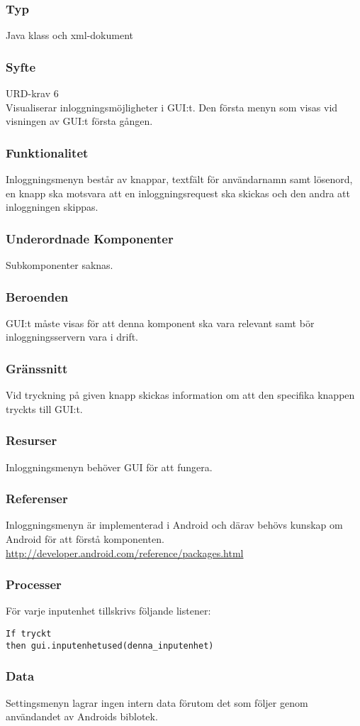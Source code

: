 \subsubsection{Typ}
Java klass och xml-dokument

\subsubsection{Syfte}
URD-krav 6 \\
Visualiserar inloggningsmöjligheter i GUI:t. Den första menyn som visas vid visningen av GUI:t första gången. 

\subsubsection{Funktionalitet}
Inloggningsmenyn består av knappar, textfält för användarnamn samt lösenord, en knapp ska motsvara att en inloggningsrequest ska skickas och den andra att inloggningen skippas.

\subsubsection{Underordnade Komponenter}
Subkomponenter saknas.

\subsubsection{Beroenden}
GUI:t måste visas för att denna komponent ska vara relevant samt bör inloggningsservern vara i drift.

\subsubsection{Gränssnitt}
Vid tryckning på given knapp skickas information om att den specifika knappen tryckts till GUI:t.

\subsubsection{Resurser}
Inloggningsmenyn behöver GUI för att fungera.

\subsubsection{Referenser}
Inloggningsmenyn är implementerad i Android och därav behövs kunskap om Android för att förstå komponenten.
\url{http://developer.android.com/reference/packages.html}

\subsubsection{Processer}
För varje inputenhet tillskrivs följande listener:
\begin{verbatim}
If tryckt
then gui.inputenhetused(denna_inputenhet)
\end{verbatim}

\subsubsection{Data}
Settingsmenyn lagrar ingen intern data förutom det som följer genom användandet av Androids biblotek.